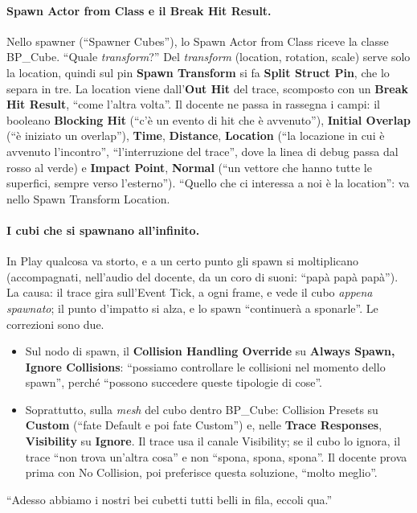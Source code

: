 \paragraph{Spawn Actor from Class e il Break Hit Result.} Nello spawner (``Spawner
Cubes''), lo Spawn Actor from Class riceve la classe BP\_Cube. ``Quale
\emph{transform}?'' Del \emph{transform} (location, rotation, scale) serve solo la
location, quindi sul pin \textbf{Spawn Transform} si fa \textbf{Split Struct Pin}, che
lo separa in tre. La location viene dall'\textbf{Out Hit} del trace, scomposto con un
\textbf{Break Hit Result}, ``come l'altra volta''. Il docente ne passa in rassegna i
campi: il booleano \textbf{Blocking Hit} (``c'è un evento di hit che è avvenuto''),
\textbf{Initial Overlap} (``è iniziato un overlap''), \textbf{Time}, \textbf{Distance},
\textbf{Location} (``la locazione in cui è avvenuto l'incontro'', ``l'interruzione del
trace'', dove la linea di debug passa dal rosso al verde) e \textbf{Impact Point},
\textbf{Normal} (``un vettore che hanno tutte le superfici, sempre verso l'esterno'').
``Quello che ci interessa a noi è la location'': va nello Spawn Transform Location.

\paragraph{I cubi che si spawnano all'infinito.} In Play qualcosa va storto, e a un certo
punto gli spawn si moltiplicano (accompagnati, nell'audio del docente, da un coro di
suoni: ``papà papà papà''). La causa: il trace gira sull'Event Tick, a ogni frame, e
vede il cubo \emph{appena spawnato}; il punto d'impatto si alza, e lo spawn ``continuerà
a sponarle''. Le correzioni sono due.
\begin{itemize}
  \item Sul nodo di spawn, il \textbf{Collision Handling Override} su \textbf{Always
        Spawn, Ignore Collisions}: ``possiamo controllare le collisioni nel momento dello
        spawn'', perché ``possono succedere queste tipologie di cose''.
  \item Soprattutto, sulla \emph{mesh} del cubo dentro BP\_Cube: Collision Presets su
        \textbf{Custom} (``fate Default e poi fate Custom'') e, nelle \textbf{Trace
        Responses}, \textbf{Visibility} su \textbf{Ignore}. Il trace usa il canale
        Visibility; se il cubo lo ignora, il trace ``non trova un'altra cosa'' e non
        ``spona, spona, spona''. Il docente prova prima con No Collision, poi preferisce
        questa soluzione, ``molto meglio''.
\end{itemize}
``Adesso abbiamo i nostri bei cubetti tutti belli in fila, eccoli qua.''

